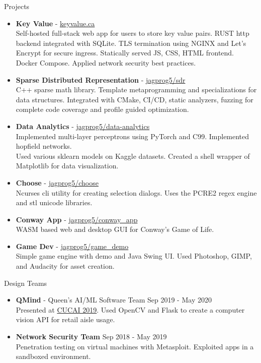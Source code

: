 \documentclass{resume} %
\begin{document}
\begin{rSection}{Projects}
    \begin{itemize}
        \item {\bf Key Value} - \href{https://keyvalue.ca/}{keyvalue.ca}\\
        Self-hosted full-stack web app for users to store key value pairs. RUST http backend integrated with SQLite. TLS termination using NGINX and Let's Encrypt for secure ingress.
        Statically served JS, CSS, HTML frontend. Docker Compose. Applied network security best practices.
        \item {\bf Sparse Distributed Representation} - \href{https://github.com/jagprog5/SDR/}{jagprog5/sdr}\\
        C++ sparse math library. Template metaprogramming and specializations for data structures. Integrated with CMake, CI/CD, static analyzers, fuzzing for complete code coverage and profile guided optimization.
        \item {\bf Data Analytics} - \href{https://github.com/jagprog5/resume/blob/main/data-analytics-projects.md}{jagprog5/data-analytics}\\
        Implemented multi-layer perceptrons using PyTorch and C99. Implemented hopfield networks.\\
        Used various sklearn models on Kaggle datasets. Created a shell wrapper of Matplotlib for data visualization. 
        \item {\bf Choose} - \href{https://github.com/jagprog5/choose/}{jagprog5/choose}\\
        Ncurses cli utility for creating selection dialogs. Uses the PCRE2 regex engine and stl unicode libraries.
        \item {\bf Conway App} - \href{https://github.com/jagprog5/conway_app/}{jagprog5/conway\_app}\\
        WASM based web and desktop GUI for Conway's Game of Life.
        \item {\bf Game Dev} - \href{https://github.com/jagprog5/GameDemo}{jagprog5/game\_demo}\\
        Simple game engine with demo and Java Swing UI. Used Photoshop, GIMP, and Audacity for asset creation.
    \end{itemize}
\end{rSection}

\begin{rSection}{Design Teams}
    \begin{itemize}
        \item {\bf QMind} - Queen's AI/ML Software Team \hfill {Sep 2019 - May 2020}\\
        Presented at \href{https://medium.com/qmind-ai/cucai2019-c9d5f848f5c}{CUCAI 2019}. Used OpenCV and Flask to create a computer vision API for retail aisle usage.
        \item {\bf Network Security Team} \hfill {Sep 2018 - May 2019}\\
        Penetration testing on virtual machines with Metasploit. Exploited apps in a sandboxed environment.
\end{itemize}
\end{rSection}
\end{document}
